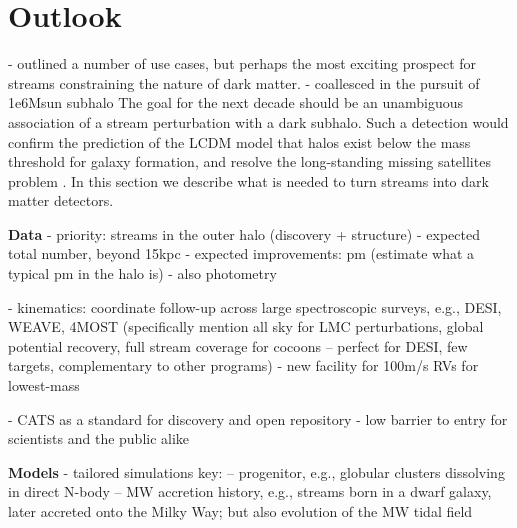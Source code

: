 \documentclass[final,5p,times,twocolumn,authoryear]{elsarticle}
\begin{document}
\section{Outlook}
\label{sec:outlook}

- outlined a number of use cases, but perhaps the most exciting prospect for streams constraining the nature of dark matter.
- coallesced in the pursuit of 1e6Msun subhalo
The goal for the next decade should be an unambiguous association of a stream perturbation with a dark subhalo.
Such a detection would confirm the prediction of the LCDM model that halos exist below the mass threshold for galaxy formation, and resolve the long-standing missing satellites problem \citep{klypin:1999}.
In this section we describe what is needed to turn streams into dark matter detectors.


\textbf{Data}
- priority: streams in the outer halo (discovery + structure)
- expected total number, beyond 15kpc
- expected improvements: pm (estimate what a typical pm in the halo is)
- also photometry

- kinematics: coordinate follow-up across large spectroscopic surveys, e.g., DESI, WEAVE, 4MOST (specifically mention all sky for LMC perturbations, global potential recovery, full stream coverage for cocoons -- perfect for DESI, few targets, complementary to other programs)
- new facility for 100m/s RVs for lowest-mass

- CATS as a standard for discovery and open repository
- low barrier to entry for scientists and the public alike


\textbf{Models}
- tailored simulations key:
-- progenitor, e.g., globular clusters dissolving in direct N-body
-- MW accretion history, e.g., streams born in a dwarf galaxy, later accreted onto the Milky Way; but also evolution of the MW tidal field
\end{document}
